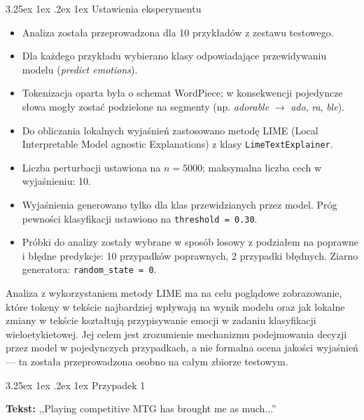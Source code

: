 \documentclass[wmii, inf, mgr]{uwmthesis}
\makeatletter
\renewcommand\paragraph{\@startsection{paragraph}{4}{\z@}%
  {3.25ex \@plus1ex \@minus.2ex}%
  {1ex}%
  {\normalfont\normalsize\bfseries}}
\makeatother
\begin{document}
\paragraph{Ustawienia eksperymentu}

\begin{itemize}
	\item Analiza została przeprowadzona dla 10 przykładów z zestawu testowego.
	
	\item Dla każdego przykładu wybierano klasy odpowiadające przewidywaniu modelu (\textit{predict emotions}).
	
	\item Tokenizacja oparta była o schemat WordPiece; w konsekwencji pojedyncze słowa mogły zostać podzielone na segmenty (np. \textit{adorable} $\rightarrow$ \textit{ado}, \textit{ra}, \textit{ble}).
	
	\item Do obliczania lokalnych wyjaśnień zastosowano metodę LIME (Local Interpretable Model agnostic Explanations) z klasy \texttt{LimeTextExplainer}.
	
	\item Liczba perturbacji ustawiona na $n = 5000$; maksymalna liczba cech w wyjaśnieniu: 10.
	
	\item Wyjaśnienia generowano tylko dla klas przewidzianych przez model. Próg pewności klasyfikacji ustawiono na \texttt{threshold = 0.30}.
	
	\item Próbki do analizy zostały wybrane w sposób losowy z podziałem na poprawne i błędne predykcje: 10 przypadków poprawnych, 2 przypadki błędnych. Ziarno generatora: \texttt{random\_state = 0}.
\end{itemize}

Analiza z wykorzystaniem metody LIME ma na celu poglądowe zobrazowanie, które tokeny w tekście najbardziej wpływają na wynik modelu oraz jak lokalne zmiany w tekście kształtują przypisywanie emocji w zadaniu klasyfikacji wieloetykietowej. Jej celem jest zrozumienie mechanizmu podejmowania decyzji przez model w pojedynczych przypadkach, a nie formalna ocena jakości wyjaśnień — ta została przeprowadzona osobno na całym zbiorze testowym.


\paragraph{Przypadek 1}

\textbf{Tekst:} ,,Playing competitive MTG has brought me as much...''
\end{document}
